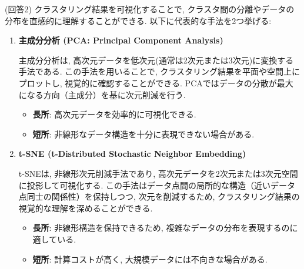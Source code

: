 \documentclass[dvipdfmx, 10pt]{jsarticle}
\begin{document}
(回答2)
クラスタリング結果を可視化することで, クラスタ間の分離やデータの分布を直感的に理解することができる. 
以下に代表的な手法を2つ挙げる:

\begin{enumerate}
    \item \textbf{主成分分析 (PCA: Principal Component Analysis)}

    主成分分析は, 高次元データを低次元(通常は2次元または3次元)に変換する手法である. この手法を用いることで, クラスタリング結果を平面や空間上にプロットし, 視覚的に確認することができる. PCAではデータの分散が最大になる方向（主成分）を基に次元削減を行う.
    \begin{itemize}
        \item \textbf{長所}: 高次元データを効率的に可視化できる.
        \item \textbf{短所}: 非線形なデータ構造を十分に表現できない場合がある.
    \end{itemize}

    \item \textbf{t-SNE (t-Distributed Stochastic Neighbor Embedding)}

    t-SNEは, 非線形次元削減手法であり, 高次元データを2次元または3次元空間に投影して可視化する. この手法はデータ点間の局所的な構造（近いデータ点同士の関係性）を保持しつつ, 次元を削減するため, クラスタリング結果の視覚的な理解を深めることができる.
    \begin{itemize}
        \item \textbf{長所}: 非線形構造を保持できるため, 複雑なデータの分布を表現するのに適している.
        \item \textbf{短所}: 計算コストが高く, 大規模データには不向きな場合がある.
    \end{itemize}
\end{enumerate}
\end{document}
